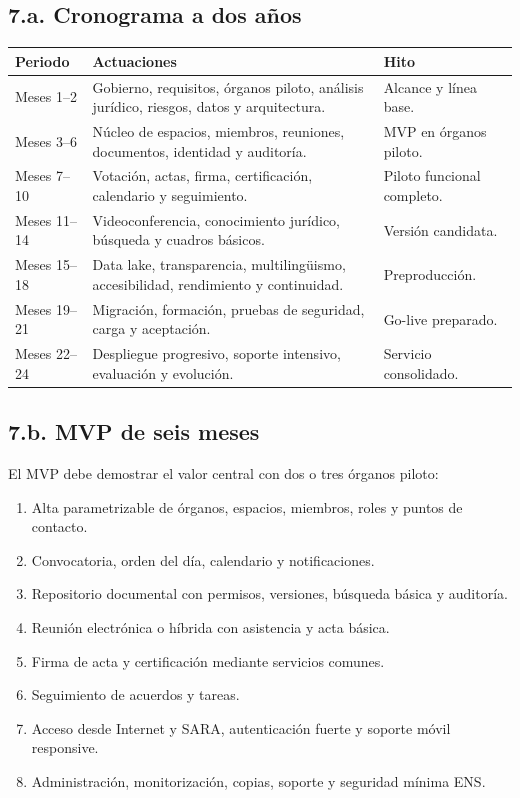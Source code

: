 \documentclass[11pt,a4paper]{article}
\begin{document}
\subsection{7.a. Cronograma a dos años}
\begin{center}
\begin{tabularx}{0.95\textwidth}{l Y Y}\toprule
\textbf{Periodo} & \textbf{Actuaciones} & \textbf{Hito}\\\midrule
Meses 1--2 & Gobierno, requisitos, órganos piloto, análisis jurídico, riesgos, datos y arquitectura. & Alcance y línea base.\\
Meses 3--6 & Núcleo de espacios, miembros, reuniones, documentos, identidad y auditoría. & MVP en órganos piloto.\\
Meses 7--10 & Votación, actas, firma, certificación, calendario y seguimiento. & Piloto funcional completo.\\
Meses 11--14 & Videoconferencia, conocimiento jurídico, búsqueda y cuadros básicos. & Versión candidata.\\
Meses 15--18 & Data lake, transparencia, multilingüismo, accesibilidad, rendimiento y continuidad. & Preproducción.\\
Meses 19--21 & Migración, formación, pruebas de seguridad, carga y aceptación. & Go-live preparado.\\
Meses 22--24 & Despliegue progresivo, soporte intensivo, evaluación y evolución. & Servicio consolidado.\\\bottomrule
\end{tabularx}\end{center}

\subsection{7.b. MVP de seis meses}

El MVP debe demostrar el valor central con dos o tres órganos piloto:
\begin{enumerate}
\item Alta parametrizable de órganos, espacios, miembros, roles y puntos de contacto.
\item Convocatoria, orden del día, calendario y notificaciones.
\item Repositorio documental con permisos, versiones, búsqueda básica y auditoría.
\item Reunión electrónica o híbrida con asistencia y acta básica.
\item Firma de acta y certificación mediante servicios comunes.
\item Seguimiento de acuerdos y tareas.
\item Acceso desde Internet y SARA, autenticación fuerte y soporte móvil responsive.
\item Administración, monitorización, copias, soporte y seguridad mínima ENS.
\end{enumerate}
\end{document}
